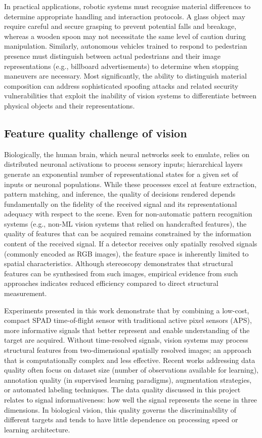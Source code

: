 \documentclass[12pt,a4paper,oneside]{report}
\begin{document}
In practical applications, robotic systems must recognise material differences to determine appropriate handling and interaction protocols. A glass object may require careful and secure grasping to prevent potential falls and breakage, whereas a wooden spoon may not necessitate the same level of caution during manipulation. Similarly, autonomous vehicles trained to respond to pedestrian presence must distinguish between actual pedestrians and their image representations (e.g., billboard advertisements) to determine when stopping maneuvers are necessary. Most significantly, the ability to distinguish material composition can address sophisticated spoofing attacks and related security vulnerabilities that exploit the inability of vision systems to differentiate between physical objects and their representations.


\subsection{Feature quality challenge of vision}
\label{sec:feature_quality_challenge}

Biologically, the human brain, which neural networks seek to emulate, relies on distributed neuronal activations to process sensory inputs; hierarchical layers generate an exponential number of representational states for a given set of inputs or neuronal populations. While these processes excel at feature extraction, pattern matching, and inference, the quality of decisions rendered depends fundamentally on the fidelity of the received signal and its representational adequacy with respect to the scene. Even for non-automatic pattern recognition systems (e.g., non-ML vision systems that relied on handcrafted features), the quality of features that can be acquired remains constrained by the information content of the received signal. If a detector receives only spatially resolved signals (commonly encoded as RGB images), the feature space is inherently limited to spatial characteristics. Although stereoscopy demonstrates that structural features can be synthesised from such images, empirical evidence from such approaches indicates reduced efficiency compared to direct structural measurement.

Experiments presented in this work demonstrate that by combining a low-cost, compact SPAD time-of-flight sensor with traditional active pixel sensors (APS), more informative signals that better represent and enable understanding of the target are acquired. Without time-resolved signals, vision systems may process structural features from two-dimensional spatially resolved images; an approach that is computationally complex and less effective. Recent works addressing data quality often focus on dataset size (number of observations available for learning), annotation quality (in supervised learning paradigms), augmentation strategies, or automated labeling techniques. The data quality discussed in this project relates to signal informativeness: how well the signal represents the scene in three dimensions. In biological vision, this quality governs the discriminability of different targets and tends to have little dependence on processing speed or learning architecture.
\end{document}
